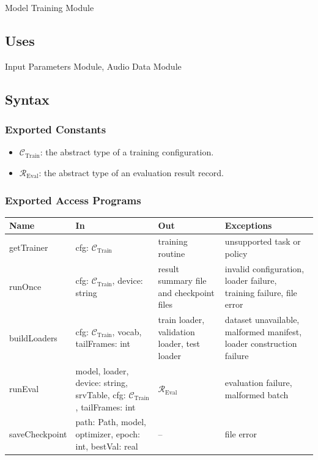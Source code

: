 \documentclass[12pt, titlepage]{article}
\begin{document}
Model Training Module

\subsection{Uses}

Input Parameters Module, Audio Data Module

\subsection{Syntax}

\subsubsection{Exported Constants}

\begin{itemize}
    \item $\mathcal{C}_{\mathrm{Train}}$: the abstract type of a training configuration.
    \item $\mathcal{R}_{\mathrm{Eval}}$: the abstract type of an evaluation result record.
\end{itemize}

\subsubsection{Exported Access Programs}

\begin{center}
\begin{tabular}{p{3.4cm} p{4.8cm} p{4.0cm} p{3.0cm}}
\hline
\textbf{Name} & \textbf{In} & \textbf{Out} & \textbf{Exceptions} \\
\hline
getTrainer &
cfg: $\mathcal{C}_{\mathrm{Train}}$ &
training routine &
unsupported task or policy \\

runOnce &
cfg: $\mathcal{C}_{\mathrm{Train}}$, device: string &
result summary file and checkpoint files &
invalid configuration, loader failure, training failure, file error \\

buildLoaders &
cfg: $\mathcal{C}_{\mathrm{Train}}$, vocab, tailFrames: int &
train loader, validation loader, test loader &
dataset unavailable, malformed manifest, loader construction failure \\

runEval &
model, loader, device: string, srvTable, cfg: $\mathcal{C}_{\mathrm{Train}}$, tailFrames: int &
$\mathcal{R}_{\mathrm{Eval}}$ &
evaluation failure, malformed batch \\

saveCheckpoint &
path: Path, model, optimizer, epoch: int, bestVal: real &
-- &
file error \\
\hline
\end{tabular}
\end{center}
\end{document}
